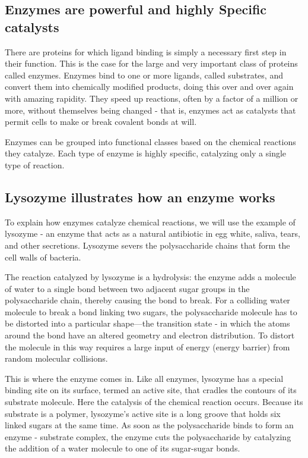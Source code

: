 \subsection{Enzymes are powerful and highly Specific catalysts}

There are proteins for which ligand binding is simply a necessary first step
in their function. This is the case for the large and very important class
of proteins called enzymes. Enzymes bind to one or more ligands, called substrates, 
and convert them into chemically modified products, doing this over and over again with amazing rapidity.
They speed up reactions, often by a factor of a
million or more, without themselves being changed - that is, enzymes act
as catalysts that permit cells to make or break covalent bonds at will.

Enzymes can be grouped into functional classes based on the chemical
reactions they catalyze. Each type of enzyme is highly specific,
catalyzing only a single type of reaction.

\subsection{Lysozyme illustrates how an enzyme works}

To explain how enzymes catalyze chemical reactions, we will use the
example of lysozyme - an enzyme that acts as a natural antibiotic in egg
white, saliva, tears, and other secretions. Lysozyme severs the polysaccharide 
chains that form the cell walls of bacteria.

The reaction catalyzed by lysozyme is a hydrolysis: the enzyme adds a
molecule of water to a single bond between two adjacent sugar groups in
the polysaccharide chain, thereby causing the bond to break.
For a colliding water molecule to break a bond linking two sugars, the
polysaccharide molecule has to be distorted into a particular shape—the
transition state - in which the atoms around the bond have an altered
geometry and electron distribution. To distort the molecule in this way
requires a large input of energy (energy barrier) from random molecular collisions.

This is where the enzyme comes in. Like all enzymes, lysozyme has a
special binding site on its surface, termed an active site, that cradles the
contours of its substrate molecule. Here the catalysis of the chemical reaction 
occurs. Because its substrate is a polymer, lysozyme’s active site is a
long groove that holds six linked sugars at the same time. As soon as the
polysaccharide binds to form an enzyme - substrate complex, the enzyme
cuts the polysaccharide by catalyzing the addition of a water molecule to
one of its sugar-sugar bonds.

